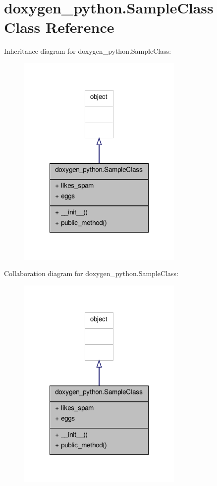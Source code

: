 \hypertarget{classdoxygen__python_1_1_sample_class}{\section{doxygen\+\_\+python.\+Sample\+Class Class Reference}
\label{classdoxygen__python_1_1_sample_class}
}


Inheritance diagram for doxygen\+\_\+python.\+Sample\+Class\+:\nopagebreak
\begin{figure}[H]
\begin{center}
\leavevmode
\includegraphics[width=228pt]{classdoxygen__python_1_1_sample_class__inherit__graph}
\end{center}
\end{figure}


Collaboration diagram for doxygen\+\_\+python.\+Sample\+Class\+:\nopagebreak
\begin{figure}[H]
\begin{center}
\leavevmode
\includegraphics[width=228pt]{classdoxygen__python_1_1_sample_class__coll__graph}
\end{center}
\end{figure}

